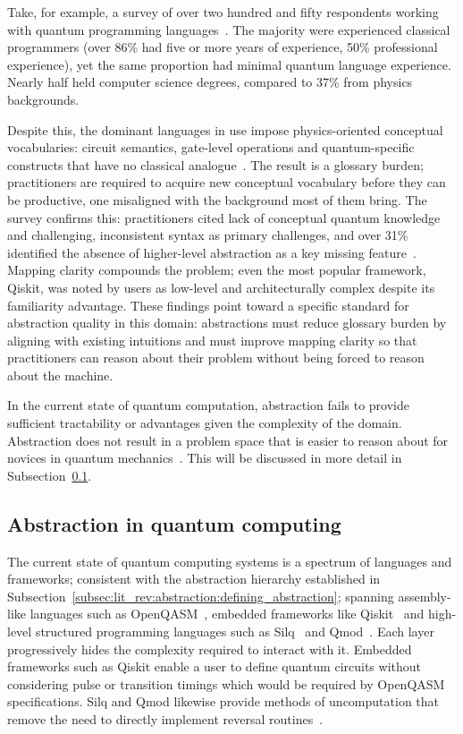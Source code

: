 Take, for example, a survey of over two hundred and fifty respondents working with quantum programming languages~\cite{ferreira2024qplusage}.
The majority were experienced classical programmers (over 86\% had five or more years of experience, 50\% professional experience), yet the same proportion had minimal quantum language experience.
Nearly half held computer science degrees, compared to 37\% from physics backgrounds.

Despite this, the dominant languages in use impose physics-oriented conceptual vocabularies: circuit semantics, gate-level operations and quantum-specific constructs that have no classical analogue~\cite{ferreira2024qplusage}.
The result is a glossary burden; practitioners are required to acquire new conceptual vocabulary before they can be productive, one misaligned with the background most of them bring.
The survey confirms this: practitioners cited lack of conceptual quantum knowledge and challenging, inconsistent syntax as primary challenges, and over 31\% identified the absence of higher-level abstraction as a key missing feature~\cite{ferreira2024qplusage}.
Mapping clarity compounds the problem; even the most popular framework, Qiskit, was noted by users as low-level and architecturally complex despite its familiarity advantage.
These findings point toward a specific standard for abstraction quality in this domain: abstractions must reduce glossary burden by aligning with existing intuitions and must improve mapping clarity so that practitioners can reason about their problem without being forced to reason about the machine.

In the current state of quantum computation, abstraction fails to provide sufficient tractability or advantages given the complexity of the domain.
Abstraction does not result in a problem space that is easier to reason about for novices in quantum mechanics~\cite{ferreira2024qplusage}.
This will be discussed in more detail in Subsection~\ref{subsec:lit_rev:abstraction:in_quantum_computing}.

\subsection{Abstraction in quantum computing}\label{subsec:lit_rev:abstraction:in_quantum_computing}
The current state of quantum computing systems is a spectrum of languages and frameworks; consistent with the abstraction hierarchy established in Subsection~\ref{subsec:lit_rev:abstraction:defining_abstraction}; spanning assembly-like languages such as OpenQASM~\cite{cross2022openqasm3}, embedded frameworks like Qiskit~\cite{aleksandrowicz2019qiskit} and high-level structured programming languages such as Silq~\cite{bichsel2020silq} and Qmod~\cite{vax2025qmodexpressivehighlevelquantum}.
Each layer progressively hides the complexity required to interact with it.
Embedded frameworks such as Qiskit enable a user to define quantum circuits without considering pulse or transition timings which would be required by OpenQASM specifications.
Silq and Qmod likewise provide methods of uncomputation that remove the need to directly implement reversal routines~\cite{bichsel2020silq, vax2025qmodexpressivehighlevelquantum}.

